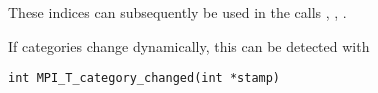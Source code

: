 \begin{mpifour}
\begin{raggedlist}
  These indices can subsequently be used in the calls
  ,
  ,
  .
\end{raggedlist}

If categories change dynamically, this can be detected with
\begin{lstlisting}
int MPI_T_category_changed(int *stamp)
\end{lstlisting}

\end{mpifour}
